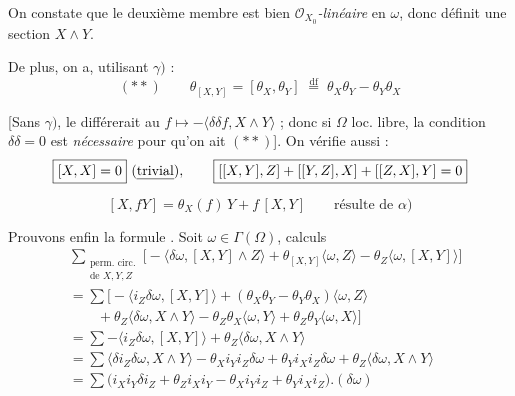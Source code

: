 \documentclass[11pt,a4paper]{article}
\begin{document}
On constate  que le deuxième membre est
bien \emph{$\mathcal{O}_{X_0}$-linéaire} en $\omega$, donc définit une
section $X \wedge Y$.

De plus, on a, utilisant $\gamma)$ :
\[
(**)\qquad \boxed{\theta_{[X,Y]} = [\theta_X, \theta_Y]}
\;\overset{\mathrm{df}}{=}\; \theta_X\theta_Y - \theta_Y\theta_X
\]

[Sans $\gamma)$, le \struck{\ill{}} \add{\ill{}} différerait au
 \ill{}
$f \mapsto -\langle \delta\delta f, X \wedge Y \rangle$ ; donc si $\Omega$
loc. libre, la condition $\delta\delta = 0$ est \emph{nécessaire} pour
qu'on ait $(**)$]. On vérifie aussi  :
\[
\boxed{[X,X] = 0}\ \text{(\uncertain{trivial})},
\qquad
\boxed{[[X,Y],Z] + [[Y,Z],X] + [[Z,X],Y] = 0}
\]

\[
\boxed{[X, fY] = \theta_X(f)\,Y + f\,[X,Y]}
\qquad \text{résulte de } \alpha)
\]

Prouvons enfin la formule \ill{}. Soit $\omega \in \Gamma(\Omega)$,
 \struck{\ill{}} calculs
\begin{align*}
&\sum_{\substack{\text{perm. circ.}\\ \text{de } X,Y,Z}}
\Big[ -\langle \delta\omega, [X,Y] \wedge Z \rangle
+ \theta_{[X,Y]} \langle \omega, Z \rangle
- \theta_Z \langle \omega, [X,Y] \rangle \Big] \\
&= \sum \Big[ -\langle i_Z \delta\omega, [X,Y] \rangle
+ (\theta_X\theta_Y - \theta_Y\theta_X) \langle \omega, Z \rangle \\
&\qquad + \theta_Z \langle \delta\omega, X \wedge Y \rangle
- \theta_Z\theta_X \langle \omega, Y \rangle
+ \theta_Z\theta_Y \langle \omega, X \rangle \Big] \\
&= \sum -\langle i_Z \delta\omega, [X,Y] \rangle
+ \theta_Z \langle \delta\omega, X \wedge Y \rangle \\
&= \sum \langle \delta i_Z \delta\omega, X \wedge Y \rangle
- \theta_X i_Y i_Z \delta\omega + \theta_Y i_X i_Z \delta\omega
+ \theta_Z \langle \delta\omega, X \wedge Y \rangle \\
&= \sum \big( i_X i_Y \delta i_Z + \theta_Z i_X i_Y
- \theta_X i_Y i_Z + \theta_Y i_X i_Z \big) . (\delta\omega)
\end{align*}
\end{document}
